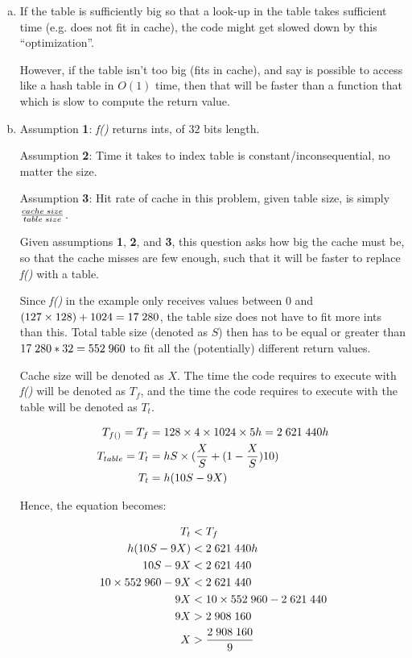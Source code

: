 \documentclass[fontsize=11pt, paper=a4, titlepage]{article}
\begin{document}
\begin{enumerate}[a)]

    \item If the table is sufficiently big so that a look-up in the table takes
sufficient time (e.g. does not fit in cache), the code might get slowed down by this ``optimization''.

However, if the table isn't too big (fits in cache), and say is possible to
access like a hash table in $O(1)$ time, then that will be faster than a
function that which is slow to compute the return value.

    \item Assumption \textbf{1}: \textit{f()} returns ints, of $32$ bits length.

Assumption \textbf{2}: Time it takes to index table is constant/inconsequential,
no matter the size.

Assumption \textbf{3}: Hit rate of cache in this problem,
given table size, is simply $\frac{cache\thickspace size}{table\thickspace size}$.

Given assumptions \textbf{1}, \textbf{2}, and \textbf{3}, this question asks how
big the cache must be, so that the cache misses are few enough, such that it
will be faster to replace \textit{f()} with a table.

Since \textit{f()} in the example only receives values between $0$ and
$(127\times 128) + 1024 = 17\thickspace 280$, the table size does not have to
fit more ints than this. Total table size (denoted as $S$) then has to be equal
or greater than $17\thickspace 280*32 = 552\thickspace 960$ to fit all the
(potentially) different return values.

Cache size will be denoted as $X$. The time the code requires to execute with
\textit{f()} will be denoted as $T_f$, and the time the code requires to execute
with the table will be denoted as $T_t$.

    \begin{align*}
        T_{f()} = T_f &= 128\times 4\times 1024\times 5h
        = 2\thickspace 621\thickspace 440h \\
        T_{table} = T_t &= hS\times(\frac{X}{S} + (1-\frac{X}{S})10)\\
        T_t &= h(10S- 9X)
    \end{align*}

Hence, the equation becomes:

    \begin{align*}
        T_t &< T_f \\
        h(10S-9X) &< 2\thickspace 621\thickspace 440h \\
        10S - 9X &< 2\thickspace 621\thickspace 440 \\
        10\times 552\thickspace 960 - 9X &< 2\thickspace 621\thickspace 440 \\
        9X &< 10\times 552\thickspace 960 - 2\thickspace 621\thickspace 440 \\
        9X &> 2\thickspace 908\thickspace 160 \\
        X &> \frac{2\thickspace 908\thickspace 160}{9}
    \end{align*}


\end{enumerate}
\end{document}
